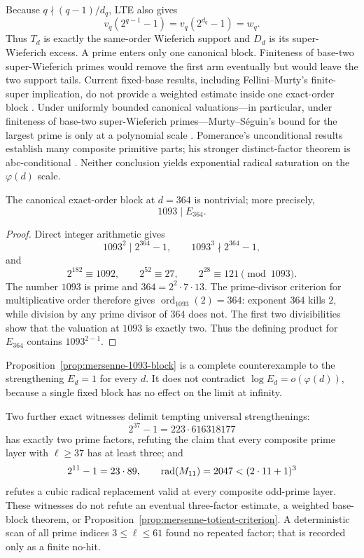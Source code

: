 Because $q\nmid(q-1)/d_q$, LTE also gives
\[
 v_q(2^{q-1}-1)=v_q(2^{d_q}-1)=w_q.
\]
Thus $T_d$ is exactly the same-order Wieferich support and $D_d$ is its
super-Wieferich excess.  A prime enters only one canonical block.  Finiteness
of base-two super-Wieferich primes would remove the first arm eventually but
would leave the two support tails.  Current fixed-base results, including
Fellini--Murty's finite-super implication, do not provide a weighted estimate
inside one exact-order block \cite{FelliniMurty2026}.  Under uniformly bounded
canonical valuations---in particular, under finiteness of base-two
super-Wieferich primes---Murty--S\'eguin's bound for the largest prime is only
at a polynomial scale
\cite{MurtySeguin2019}.  Pomerance's
unconditional results establish many composite primitive parts; his stronger
distinct-factor theorem is
abc-conditional \cite{PomeranceCyclotomic2025}.  Neither conclusion yields
exponential radical saturation on the $\varphi(d)$ scale.

\begin{proposition}
\label{prop:mersenne-1093-block}
The canonical exact-order block at $d=364$ is nontrivial; more precisely,
\[
                         1093\mid E_{364}.
\]
\end{proposition}

\begin{proof}
Direct integer arithmetic gives
\[
 1093^2\mid2^{364}-1,\qquad 1093^3\nmid2^{364}-1,
\]
and
\[
 2^{182}\equiv1092,\qquad 2^{52}\equiv27,\qquad
 2^{28}\equiv121\pmod {1093}.
\]
The number $1093$ is prime and $364=2^2\cdot7\cdot13$.  The prime-divisor
criterion for multiplicative order therefore gives
$\operatorname{ord}_{1093}(2)=364$: exponent $364$ kills $2$, while division
by any prime divisor of $364$ does not.  The first two divisibilities show
that the valuation at $1093$ is exactly two.  Thus the defining product for
$E_{364}$ contains $1093^{2-1}$.
\end{proof}

Proposition~\ref{prop:mersenne-1093-block} is a complete counterexample to
the strengthening $E_d=1$ for every $d$.  It does not contradict
$\log E_d=o(\varphi(d))$, because a single fixed block has no effect on the
limit at infinity.

Two further exact witnesses delimit tempting universal strengthenings:
\[
 2^{37}-1=223\cdot616318177
\]
has exactly two prime factors, refuting the claim that every composite prime
layer with $\ell\ge37$ has at least three; and
\[
 2^{11}-1=23\cdot89,\qquad
 \operatorname{rad}(M_{11})=2047<(2\cdot11+1)^3
\]
refutes a cubic radical replacement valid at every composite odd-prime
layer.  These witnesses do not refute an eventual three-factor estimate, a
weighted base-block theorem, or Proposition~\ref{prop:mersenne-totient-criterion}.
A deterministic scan of all prime indices $3\le\ell\le61$ found no repeated
factor; that is recorded only as a finite no-hit.

